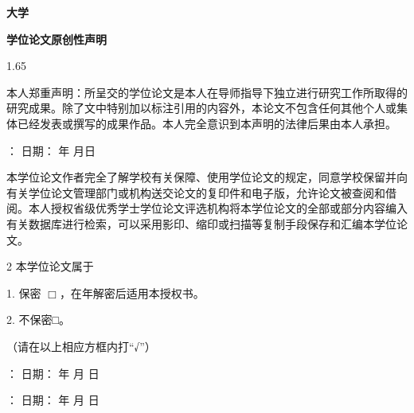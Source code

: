\thispagestyle{empty}
\centerline{\bf{\kai{}大学}}\vspace*{15pt}

\centerline{\bf \kai{}学位论文原创性声明}%
\vspace*{40pt}

\begin{spacing}{1.65}

本人郑重声明：所呈交的学位论文是本人在导师指导下独立进行研究工作所取得的研究成果。除了文中特别加以标注引用的内容外，本论文不包含任何其他个人或集体已经发表或撰写的成果作品。本人完全意识到本声明的法律后果由本人承担。

{\hspace*{3.5\ccwd}：}\hspace*{3cm}  日期：\hspace*{1.2cm} 年\hspace*{.6cm} 月\hspace*{.6cm}日\hfill

\vspace*{50pt}
\centerline{\bf {}}
\medskip

本学位论文作者完全了解学校有关保障、使用学位论文的规定，同意学校保留并向有关学位论文管理部门或机构送交论文的复印件和电子版，允许论文被查阅和借阅。本人授权省级优秀学士学位论文评选机构将本学位论文的全部或部分内容编入有关数据库进行检索，可以采用影印、缩印或扫描等复制手段保存和汇编本学位论文。\vspace*{1.9cm}
\end{spacing}

\begin{spacing}{2}
本学位论文属于

1. 保密 \quad$\Box$\quad，在\underline{}年解密后适用本授权书。

2. 不保密\quad  □。

（请在以上相应方框内打“√”）

{：}\hspace*{3cm}  日期：\hspace*{1.45cm} 年  \hspace*{.6cm} 月\hspace*{.6cm} 日\hfill

{：}\hspace*{4.7cm}  日期：\hspace*{1.45cm} 年 \hspace*{.6cm} 月 \hspace*{.6cm} 日\hfill
\end{spacing}
\restoregeometry
